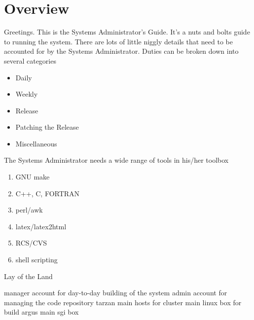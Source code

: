 \chapter{Overview}

Greetings.  This is the \aipspp Systems Administrator's Guide.  It's a nuts and bolts guide to
running the system.  There are lots of little niggly details that need to be accounted for by
the \aipspp Systems Administrator.  Duties can be broken down into several categories
\begin{itemize}
\item Daily
\item Weekly
\item Release
\item Patching the Release
\item Miscellaneous
\end{itemize}

The \aipspp Systems Administrator needs a wide range of tools in his/her toolbox

\begin{enumerate}
\item GNU make
\item C++, C, FORTRAN
\item perl/awk
\item latex/latex2html
\item RCS/CVS
\item shell scripting
\end{enumerate}

Lay of the Land

\aipspp manager account for day-to-day building of the system
\aipspp admin account for managing the code repository
tarzan main hosts for \aipspp
cluster main linux box for build \aipspp
argus main sgi box

